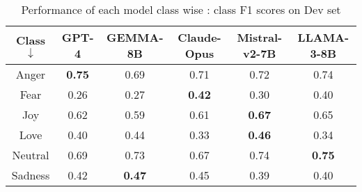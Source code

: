 \documentclass[11pt]{article}
\begin{document}
\begin{table*}[!ht]
    \centering
    \begin{tabular}{|c|c|c|c|c|c|}
    \hline
    \textbf{Class $\downarrow$}  & \hspace{1em}\textbf{GPT-4}\hspace{1em} & \textbf{GEMMA-8B} & \textbf{Claude-Opus} & \textbf{Mistral-v2-7B} & \textbf{LLAMA-3-8B} \\
    \hline
    Anger       & \textbf{0.75} & 0.69          & 0.71          & 0.72          & 0.74          \\
    Fear        & 0.26          & 0.27          & \textbf{0.42} & 0.30          & 0.40          \\
    Joy         & 0.62          & 0.59          & 0.61          & \textbf{0.67} & 0.65          \\
    Love        & 0.40          & 0.44          & 0.33          & \textbf{0.46} & 0.34          \\
    Neutral     & 0.69          & 0.73          & 0.67          & 0.74          & \textbf{0.75} \\
    Sadness     & 0.42          & \textbf{0.47} & 0.45          & 0.39          & 0.40          \\
    \hline
    \end{tabular}
    \caption{Performance of each model class wise : class F1 scores on Dev set}
    \label{table:6}
\end{table*}

\end{document}
